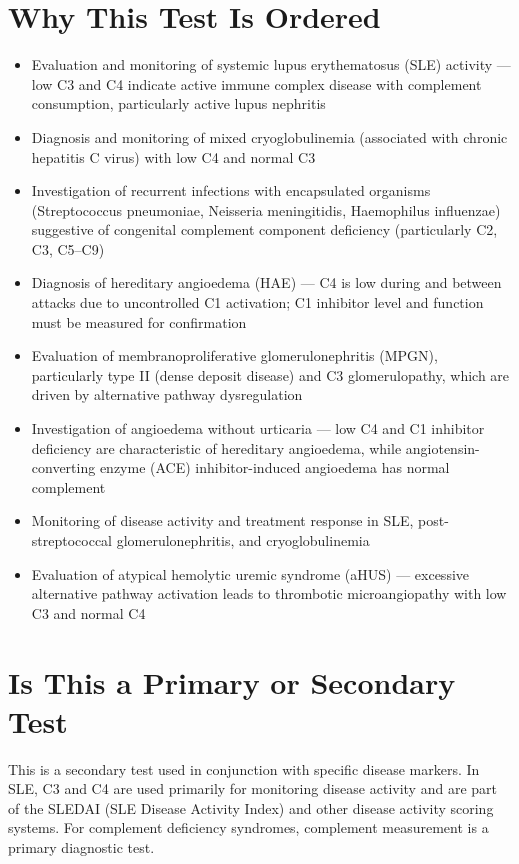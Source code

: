 \section*{Why This Test Is Ordered}
\begin{itemize}
  \item Evaluation and monitoring of systemic lupus erythematosus (SLE) activity --- low C3 and C4 indicate active immune complex disease with complement consumption, particularly active lupus nephritis
  \item Diagnosis and monitoring of mixed cryoglobulinemia (associated with chronic hepatitis C virus) with low C4 and normal C3
  \item Investigation of recurrent infections with encapsulated organisms (Streptococcus pneumoniae, Neisseria meningitidis, Haemophilus influenzae) suggestive of congenital complement component deficiency (particularly C2, C3, C5--C9)
  \item Diagnosis of hereditary angioedema (HAE) --- C4 is low during and between attacks due to uncontrolled C1 activation; C1 inhibitor level and function must be measured for confirmation
  \item Evaluation of membranoproliferative glomerulonephritis (MPGN), particularly type II (dense deposit disease) and C3 glomerulopathy, which are driven by alternative pathway dysregulation
  \item Investigation of angioedema without urticaria --- low C4 and C1 inhibitor deficiency are characteristic of hereditary angioedema, while angiotensin-converting enzyme (ACE) inhibitor-induced angioedema has normal complement
  \item Monitoring of disease activity and treatment response in SLE, post-streptococcal glomerulonephritis, and cryoglobulinemia
  \item Evaluation of atypical hemolytic uremic syndrome (aHUS) --- excessive alternative pathway activation leads to thrombotic microangiopathy with low C3 and normal C4
\end{itemize}

\section*{Is This a Primary or Secondary Test}
This is a secondary test used in conjunction with specific disease markers. In SLE, C3 and C4 are used primarily for monitoring disease activity and are part of the SLEDAI (SLE Disease Activity Index) and other disease activity scoring systems. For complement deficiency syndromes, complement measurement is a primary diagnostic test.

